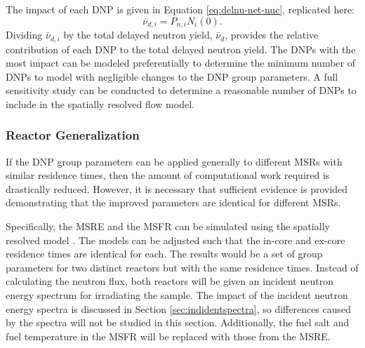 The impact of each \gls{DNP} is given in Equation \eqref{eq:delnu-net-nuc}, replicated here:
\begin{equation}
    \bar{\nu}_{d, i} = P_{n, i} N_{i}(0).
    \nonumber
\end{equation}
Dividing $\bar{\nu}_{d, i}$ by the total delayed neutron yield, $\bar{\nu}_d$, provides the relative contribution of each \gls{DNP} to the total delayed neutron yield.
The \glspl{DNP} with the most impact can be modeled preferentially to determine the minimum number of \glspl{DNP} to model with negligible changes to the \gls{DNP} group parameters.
A full sensitivity study can be conducted to determine a reasonable number of \glspl{DNP} to include in the spatially resolved flow model.

\subsubsection{Reactor Generalization}
If the \gls{DNP} group parameters can be applied generally to different \glspl{MSR} with similar residence times, then the amount of computational work required is drastically reduced.
However, it is necessary that sufficient evidence is provided demonstrating that the improved parameters are identical for different \glspl{MSR}.

Specifically, the \gls{MSRE} and the \gls{MSFR} can be simulated using the spatially resolved model \cite{robertson1965msre, brovchenko2019neutronic}.
The models can be adjusted such that the in-core and ex-core residence times are identical for each.
The results would be a set of group parameters for two distinct reactors but with the same residence times.
Instead of calculating the neutron flux, both reactors will be given an incident neutron energy spectrum for irradiating the sample.
The impact of the incident neutron energy spectra is discussed in Section \ref{sec:indidentspectra}, so differences caused by the spectra will not be studied in this section.
Additionally, the fuel salt and fuel temperature in the \gls{MSFR} will be replaced with those from the \gls{MSRE}.

